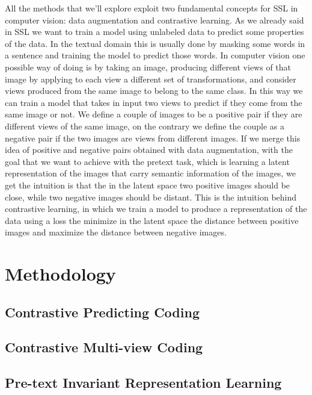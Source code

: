 \documentclass[12pt]{article}
\begin{document}
	All the methods that we'll explore exploit two fundamental concepts for SSL in computer vision: data augmentation and contrastive learning. As we already said in SSL we want to train a model using unlabeled data to predict some properties of the data. In the textual domain this is usually done by masking some words in a sentence and training the model to predict those words. In computer vision one possible way of doing is by taking an image, producing different views of that image by applying to each view a different set of transformations, and consider views produced from the same image to belong to the same class. In this way we can train a model that takes in input two views to predict if they come from the same image or not. We define a couple of images to be a positive pair if they are different views of the same image, on the contrary we define the couple as a negative pair if the two images are views from different images. If we merge this idea of positive and negative pairs obtained with data augmentation, with the goal that we want to achieve with the pretext task, which is learning a latent representation of the images that carry semantic information of the images, we get the intuition is that the in the latent space two positive images should be close, while two negative images should be distant. This is the intuition behind contrastive learning, in which we train a model to produce a representation of the data using a loss the minimize in the latent space the distance between positive images and maximize the distance between negative images.
	
	
	\section{Methodology}
	
	\subsection*{Contrastive Predicting Coding}
	
	
	\subsection*{Contrastive Multi-view Coding}
	
	
	\subsection*{Pre-text Invariant Representation Learning}
	
	
\end{document}
